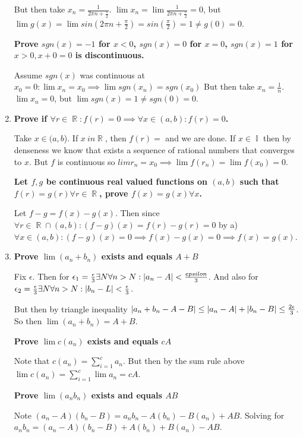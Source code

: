 \documentclass[10pt,a4paper]{article}
\DeclareMathOperator*{\R}{\mathbb{R}}
\DeclareMathOperator*{\I}{\mathbb{I}}
\DeclarePairedDelimiter{\abs}{\lvert}{\rvert}
\begin{document}
\begin{enumerate}
        But then take $x_n = \frac{1}{2\pi n + \frac{\pi}{2}}$.  $\lim x_n = \lim \frac{1}{2\pi n + \frac{\pi}{2}} = 0$, but $\lim g(x)  = \lim sin(2\pi n + \frac{\pi}{2}) = sin(\frac{\pi}{2}) = 1 \neq g(0) = 0$. 

        \textbf{Prove $sgn(x) = -1 $ for $x < 0$, $sgn(x) = 0$ for $ x= 0$, $sgn(x) = 1 $ for $x >0, x+0=0$ is discontinuous.}

        Assume $sgn(x)$ was continuous at $x_0 = 0: \lim x_n = x_0 \implies  \lim sgn(x_n) = sgn(x_0)$ 
        But then take $x_n = \frac{1}{n}$.  $\lim x_n = 0$, but $\lim sgn(x) = 1 \neq sgn(0) = 0$. 


    \item \textbf{Prove if $\forall r \in \R: f(r) = 0 \implies \forall x \in (a, b): f(r) = 0$.}

        Take $x \in (a, b$). If $ x\ in \R$, then $f(r) = $ and we are done. If $x \in \I$ then by denseness we know that exists a sequence of rational numbers that converges to $x$. But $f$ is continuous so $lim r_n = x_0 \implies \lim f(r_n) = \lim f(x_0) = 0$.

        \textbf{Let $f, g$ be continuous real valued functions on $(a,b)$ such that $f(r) = g(r) \forall r\in \R$, prove $f(x) = g(x) \forall x$.}

        Let $ f-g = f(x) - g(x)$. Then since $\forall r \in \R \cap (a, b): (f-g)(x) = f(r) - g(r)  = 0$ by a) $ \forall x \in (a,b) : (f-g) (x) = 0  \implies f(x) - g(x) = 0 \implies f(x) = g(x)$.

    \item \textbf{Prove $\lim (a_n+b_n)$ exists and equals $A + B$}

        Fix $\epsilon$. Then for $\epsilon_1 = \frac{\epsilon}{3} \exists N \forall n > N: \abs{a_n - A} < \frac{epsilon}{3}$. And also for $\epsilon_2 = \frac{\epsilon}{3} \exists N \forall n > N: \abs{b_n - L} < \frac{\epsilon}{3}$.

        But then by triangle inequality $\abs{a_n + b_n - A -B} \leq \abs{a_n -A} +\abs{b_n - B} \leq \frac{2\epsilon}{3}$. So then $\lim (a_n + b_n) = A+B$.

        \textbf{Prove $\lim c (a_n)$ exists and equals $cA$}

        Note that $c (a_n) = \sum_{i=1}^c a_n$. But then by the sum rule above $\lim c(a_n) = \sum_{i=1}^c \lim a_n = cA$.

        \textbf{Prove $\lim (a_n b_n)$ exists and equals $AB$}

        Note $(a_n - A) (b_n -B) = a_n b_n - A( b_n) - B(a_n) + AB$. Solving for $a_n b_n = (a_n - A) (b_n-B) + A(b_n) + B(a_n) -AB$.


\end{enumerate}
\end{document}
